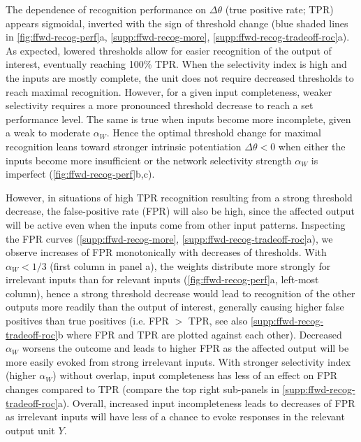 The dependence of recognition performance on $\Delta\theta$ (true positive rate; TPR)
    appears sigmoidal, inverted with the sign of threshold change
        (blue shaded lines in \autoref{fig:ffwd-recog-perf}a,
        \autoref{supp:ffwd-recog-more},
        \autoref{supp:ffwd-recog-tradeoff-roc}a).
    As expected, lowered thresholds allow for easier recognition of the output of interest, eventually reaching 100\% TPR.
    When the selectivity index is high and the inputs are mostly complete, the unit does not require decreased thresholds to reach maximal recognition.
    However, for a given input completeness, weaker selectivity requires a more pronounced threshold decrease to reach a set performance level.
    The same is true when inputs become more incomplete, given a weak to moderate $\alpha_W$.
    Hence the optimal threshold change for maximal recognition leans toward stronger intrinsic potentiation $\Delta \theta < 0$
        when either the inputs become more insufficient or the network selectivity strength $\alpha_W$ is imperfect (\autoref{fig:ffwd-recog-perf}b,c).

However, in situations of high TPR recognition resulting from a strong threshold decrease,
        the false-positive rate (FPR) will also be high,
        since the affected output will be active even when the inputs come from other input patterns.
    Inspecting the FPR curves (\autoref{supp:ffwd-recog-more}, \autoref{supp:ffwd-recog-tradeoff-roc}a),
        we observe increases of FPR monotonically with decreases of thresholds.
    With $\alpha_W < 1/3$ (first column in panel a), the weights distribute more strongly for irrelevant inputs than for relevant inputs
        (\autoref{fig:ffwd-recog-perf}a, left-most column),
        hence a strong threshold decrease would lead to recognition of the other outputs more readily than the output of interest,
        generally causing higher false positives than true positives
        (i.e. FPR $>$ TPR, see also \autoref{supp:ffwd-recog-tradeoff-roc}b where FPR and TPR are plotted against each other).
    Decreased $\alpha_W$ worsens the outcome and leads to higher FPR
        as the affected output will be more easily evoked from strong irrelevant inputs.
    With stronger selectivity index (higher $\alpha_W$) without overlap,
        input completeness has less of an effect on FPR changes compared to TPR
        (compare the top right sub-panels in \autoref{supp:ffwd-recog-tradeoff-roc}a).
    Overall, increased input incompleteness leads to decreases of FPR
        as irrelevant inputs will have less of a chance to evoke responses in the relevant output unit $Y$.

